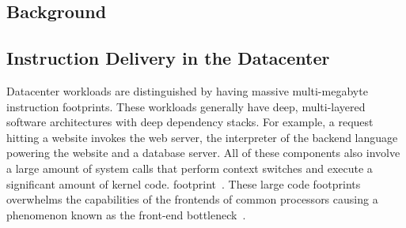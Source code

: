 \documentclass[../main.tex]{subfiles}
\begin{document}
\ifx\chapincluded\undefined
  \begin{refsection}
 \fi

\chapter{Background}
\label{chap:background}



\section{Instruction Delivery in the Datacenter}
\label{sec:instr-delivery}

\label{sec:btb-background}


Datacenter workloads are distinguished by having massive multi-megabyte instruction footprints. These workloads generally have deep, multi-layered software architectures with deep dependency stacks. For example, a request hitting a website invokes the web server, the interpreter of the backend language powering the website and a database server. All of these components also involve a large amount of system calls that perform context switches and execute a significant amount of kernel code. footprint~\cite{ferdman12_clear_cloud,ailamaki99_dbmss_moder_proces}. These large code footprints overwhelms the capabilities of the frontends of common processors causing a phenomenon known as the front-end bottleneck~\cite{kanev15_profil,ferdman12_clear_cloud,ayers19_asmdb,kanev15_profil,kumar17_boomer,kumar18_blast_throug_front_end_bottl_with_shotg,kumar20_shoot_down_server_front_end_bottl}.


\end{refsection}
\end{document}
